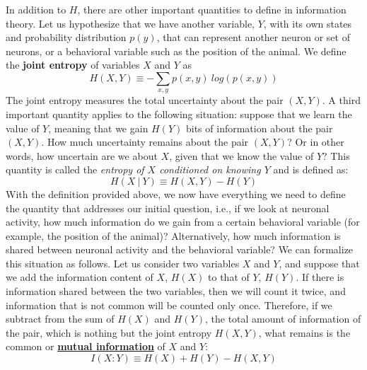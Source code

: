 In addition to $H$, there are other important quantities to define in information theory.
Let us hypothesize that we have another variable, $Y$, with its own states and probability distribution ${p(y)}$, that can represent another neuron or set of neurons, or a behavioral variable such as the position of the animal. 
We define the \textbf{joint entropy} of variables $X$ and $Y$ as
\begin{equation}
\label{eqn:jointentropy}
    H(X,Y)\equiv-\sum_{x,y}p(x,y)\ log(p(x,y)) 
\end{equation}
The joint entropy measures the total uncertainty about the pair $(X,Y)$.
A third important quantity applies to the following situation: suppose that we learn the value of $Y$, meaning that we gain $H(Y)$ bits of information about the pair $(X,Y)$.
How much uncertainty remains about the pair $(X,Y)$? 
Or in other words, how uncertain are we about $X$, given that we know the value of $Y$?
This quantity is called the \textit{entropy of $X$ conditioned on knowing $Y$} and is defined as:
\begin{equation}
\label{eqn:condentropy}
    H(X\ |\ Y) \equiv H(X,Y)-H(Y)
\end{equation}
With the definition provided above, we now have everything we need to define the quantity that addresses our initial question, i.e., if we look at neuronal activity, how much information do we gain from a certain behavioral variable (for example, the position of the animal)? 
Alternatively, how much information is shared between neuronal activity and the behavioral variable?
We can formalize this situation as follows.
Let us consider two variables $X$ and $Y$, and suppose that we add the information content of $X$, $H(X)$ to that of $Y$, $H(Y)$.
If there is information shared between the two variables, then we will count it twice, and information that is not common will be counted only once. 
Therefore, if we subtract from the sum of $H(X)$ and $H(Y)$, the total amount of information of the pair, which is nothing but the joint entropy $H(X,Y)$, what remains is the common or \underline{\textbf{mutual information}} of $X$ and $Y$:
\begin{equation}
\label{eqn:mutualinfo1}
    I(X:Y)\equiv H(X)+H(Y)-H(X,Y)
\end{equation}


